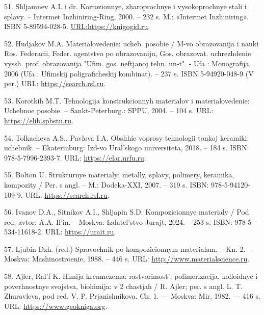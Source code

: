\begin{references}
51. Shljamnev A.I. i dr. Korrozionnye, zharoprochnye i vysokoprochnye
stali i splavy. – Intermet Inzhiniring-Ring, 2000. – 232 s. M.:
«Intermet Inzhiniring». ISBN
5-89594-028-5. \href{https://knigogid.ru/books/1935439-korrozionnostoykie-zharostoykie-i-vysokoprochnye-stali-i-splavy-spravochnik/toread?update_page}{URL:https://knigogid.ru}.

52. Hudjakov M.A. Materialovedenie: ucheb. posobie / M-vo obrazovanija
i nauki Ros. Federacii, Feder. agentstvo po obrazovaniju,
Gos. obrazovat. uchrezhdenie vyssh. prof. obrazovanija
"Ufim. gos. neftjanoj tehn. un-t". - Ufa : Monografija, 2006 (Ufa :
Ufimskij poligraficheskij kombinat). – 237 s. ISBN 5-94920-048-9 (V
per.)
URL: \href{https://search.rsl.ru/ru/record/01002872641?ysclid=m83b6quwea630137991}{https://search.rsl.ru}.

53. Korotkih M.T. Tehnologija konstrukcionnyh materialov i
materialovedenie: Uchebnoe posobie. – Sankt-Peterburg.: SPPU, 2004. –
104
s. URL: \href{https://elib.spbstu.ru/dl/641.pdf/view}{https://elib.spbstu.ru}.

54. Tolkacheva A.S., Pavlova I.A. Obshhie voprosy tehnologii tonkoj
keramiki: uchebnik. – Ekaterinburg: Izd-vo Ural'skogo universiteta,
2018. – 184 s. ISBN:
978-5-7996-2393-7. URL: \href{https://elar.urfu.ru/bitstream/10995/60942/1/978-5-7996-2393-7_2018.pdf?utm_source}{https://elar.urfu.ru}.

55. Bolton U. Strukturnye materialy: metally, splavy, polimery,
keramika, kompozity / Per. s angl. – M.: Dodeka-XXI, 2007. – 319
s. ISBN:
978-5-94120-109-9. URL: \href{https://search.rsl.ru/ru/record/01003036731}{https://search.rsl.ru}.

56. Ivanov D.A., Sitnikov A.I., Shljapin S.D. Kompozicionnye materialy
/ Pod red. avtor: A.A. Il'in. – Moskva: Izdatel'stvo Jurajt, 2024. –
253 s. ISBN:
978-5-534-11618-2. URL: \href{https://urait.ru/book/kompozicionnye-materialy-542670}{https://urait.ru}.

57. Ljubin Dzh. (red.) Spravochnik po kompozicionnym materialam. –
Kn. 2. – Moskva: Mashinostroenie, 1988. – 446
s. URL: \href{http://www.materialscience.ru/subjects/materialovedenie/knigi/spravochnik_po_kompozitsionnim_materialam__pod_red_dzh_lyubina_kn2__m_mashinostroenie_1988__446_s_21_01_2010}{http://www.materialscience.ru}.

58. Ajler, Ral'f K. Himija kremnezema: rastvorimost', polimerizacija,
kolloidnye i poverhnostnye svojstva, biohimija: v 2 chastjah /
R. Ajler; per. s angl. L. T. Zhuravleva, pod
red. V. P. Prjanishnikova. Ch. 1. — Moskva: Mir, 1982. — 416
s. URL: \href{https://www.geokniga.org/books/10605?utm_source}{https://www.geokniga.org}.


\end{references}
